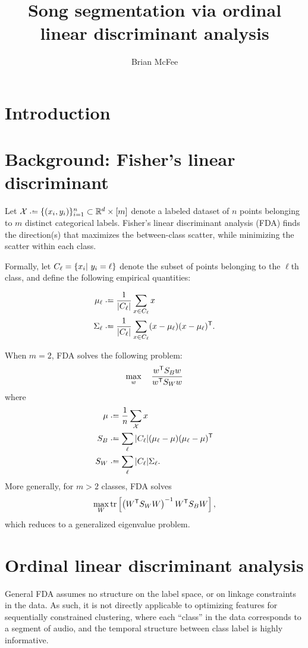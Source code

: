 \documentclass{article}
\title{Song segmentation via ordinal linear discriminant analysis}
\author{Brian McFee}
\begin{document}
\maketitle

\section{Introduction}

\section{Background: Fisher's linear discriminant}

Let $\X \defeq \{(x_i, y_i)\}_{i=1}^n \subset \R^d \times [m]$ denote a labeled 
dataset of $n$ points belonging to $m$ distinct categorical labels.
Fisher's linear discriminant analysis (FDA) finds the direction(s) that maximizes the
between-class scatter, while minimizing the scatter within each class.

Formally, let $C_\ell = \{ x_i |~ y_i = \ell \}$ denote the subset of points
belonging to the $\ell$th class, and define the following empirical quantities:

\begin{align*}
\mu_\ell &\defeq \frac{1}{|C_\ell|} \sum_{x \in C_\ell} x\\
\Sigma_\ell &\defeq \frac{1}{|C_\ell|} \sum_{x \in C_\ell}
(x-\mu_\ell)(x-\mu_\ell)\trans.\\
\end{align*}

When $m=2$, FDA solves the following problem:
\[
\max_w \quad \frac{w^\mathsf{T} S_B w}{w^\mathsf{T} S_W w}
\]
where 
\begin{align*}
\mu &\defeq \frac{1}{n} \sum_\X x\\
S_B &\defeq \sum_\ell |C_\ell| (\mu_\ell - \mu)(\mu_\ell - \mu)\trans\\
S_W &\defeq \sum_\ell |C_\ell| \Sigma_\ell.
\end{align*}
More generally, for $m>2$ classes, FDA solves
\[
\max_W \operatorname{tr}\left[\left(W^\mathsf{T} S_W W\right)^{-1} W^\mathsf{T} S_B W\right],
\]
which reduces to a generalized eigenvalue problem.


\section{Ordinal linear discriminant analysis}
General FDA assumes no structure on the label space, or on linkage constraints in the data.  
As such, it is not directly applicable to optimizing features for sequentially constrained clustering, where each ``class'' in the data corresponds to a segment of audio, and the
temporal structure between class label is highly informative.
\end{document}

